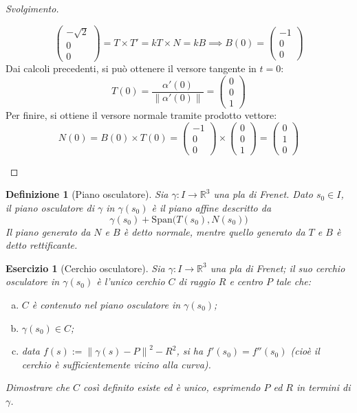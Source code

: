 \documentclass[12pt]{scrartcl}
\theoremstyle{style}
\newtheorem{definizione}{Definizione}[section]
\newtheorem{esercizio}{Esercizio}[section]
\newenvironment{svolgimento}{\renewcommand\qedsymbol{$\blacksquare$}\begin{proof}[Svolgimento]}{\end{proof}}
\numberwithin{equation}{subsection}
\begin{document}
\begin{svolgimento}
\begin{enumerate}[(a).]
		\[
		\begin{pmatrix} - \sqrt{2} \\0 \\0 \end{pmatrix} = T \times T' = k T \times N = k B \implies B(0) = \begin{pmatrix} -1 \\0 \\0  \end{pmatrix} 
		\] 
	Dai calcoli precedenti, si pu\`o ottenere il versore tangente in $t=0$:
	\[
	T(0) = \frac{\alpha '(0)}{\left\lVert \alpha '(0) \right\rVert } = \begin{pmatrix} 0 \\ 0 \\ 1 \end{pmatrix} 
	\] 
	Per finire, si ottiene il versore normale tramite prodotto vettore:
	\[
	N(0) = B(0) \times T(0) = \begin{pmatrix} -1 \\0 \\0 \end{pmatrix} \times \begin{pmatrix} 0\\0\\ 1 \end{pmatrix} = \begin{pmatrix} 0 \\ 1 \\0 \end{pmatrix} 
	\] 
	\end{enumerate}
\end{svolgimento}
\begin{definizione}
	[Piano osculatore]
	Sia $\gamma:I\to\mathbb{R}^3$ una pla di Frenet. 
	Dato $s_0 \in I$, il \textit{piano osculatore} di $\gamma$ in $\gamma(s_0)$ \`e il piano affine descritto da
	\[
	\gamma(s_0) + \mathrm{Span} \big(T(s_0),N(s_0)\big)
	\] 
	Il piano generato da $N$ e $B$ \`e detto \textit{normale}, mentre quello generato da $T$ e $B$ \`e detto \textit{rettificante}.
\end{definizione}
\begin{esercizio}
	[Cerchio osculatore]	
	Sia $\gamma : I \to \mathbb{R}^3$ una pla di Frenet; il suo \textit{cerchio osculatore} in $\gamma(s_0)$ \`e l'unico cerchio $C$ di raggio $R$ e centro $P$ tale che:
	\begin{enumerate}[(a).]
		\item $C$ \`e contenuto nel piano osculatore in $\gamma(s_0)$;
		\item $\gamma(s_0) \in C$;
		\item data $f(s) := \left\lVert \gamma(s) - P \right\rVert ^2 - R^2$, si ha $f'(s_0) = f''(s_0)$ (cio\`e il cerchio \`e sufficientemente vicino alla curva).
	\end{enumerate}
	Dimostrare che $C$ cos\`i definito esiste ed \`e unico, esprimendo $P$ ed $R$ in termini di $\gamma$.
\end{esercizio}
\end{document}
